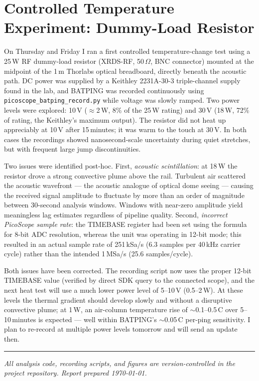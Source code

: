 \documentclass[11pt]{article}
\begin{document}
\section{Controlled Temperature Experiment: Dummy-Load Resistor}

On Thursday and Friday I ran a first controlled temperature-change test using
a 25\,W RF dummy-load resistor (XRDS-RF, 50\,$\Omega$, BNC connector)
mounted at the midpoint of the 1\,m Thorlabs optical breadboard, directly
beneath the acoustic path.
DC power was supplied by a Keithley 2231A-30-3 triple-channel supply found
in the lab, and BATPING was recorded continuously using
\texttt{picoscope\_batping\_record.py} while voltage was slowly ramped.
Two power levels were explored: 10\,V ($\approx$2\,W, 8\% of the 25\,W
rating) and 30\,V (18\,W, 72\% of rating, the Keithley's maximum output).
The resistor did not heat up appreciably at 10\,V after 15\,minutes;
it was warm to the touch at 30\,V.
In both cases the recordings showed nanosecond-scale uncertainty during
quiet stretches, but with frequent large jump discontinuities.

Two issues were identified post-hoc.
First, \textit{acoustic scintillation}: at 18\,W the resistor drove a strong
convective plume above the rail.
Turbulent air scattered the acoustic wavefront --- the acoustic analogue of
optical dome seeing --- causing the received signal amplitude to fluctuate
by more than an order of magnitude between 30-second analysis windows.
Windows with near-zero amplitude yield meaningless lag estimates regardless
of pipeline quality.
Second, \textit{incorrect PicoScope sample rate}: the TIMEBASE register had
been set using the formula for 8-bit ADC resolution, whereas the unit was
operating in 12-bit mode; this resulted in an actual sample rate of
251\,kSa/s (6.3 samples per 40\,kHz carrier cycle) rather than the intended
1\,MSa/s (25.6 samples/cycle).

Both issues have been corrected.
The recording script now uses the proper 12-bit TIMEBASE value (verified by
direct SDK query to the connected scope), and the next heat test will use
a much lower power level of 5--10\,V (0.5--2\,W).
At these levels the thermal gradient should develop slowly and without a
disruptive convective plume; at 1\,W, an air-column temperature rise of
$\sim$0.1--0.5\,\textdegree C over 5--10\,minutes is expected --- well
within BATPING's $\sim$0.05\,\textdegree C per-ping sensitivity.
I plan to re-record at multiple power levels tomorrow and will send an
update then.

\bigskip
\hrule
\vspace{4pt}
\noindent\small\textit{%
  All analysis code, recording scripts, and figures are version-controlled
  in the project repository.
  Report prepared \today.}
\end{document}
